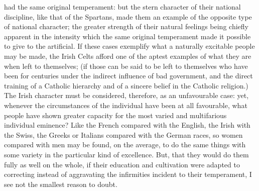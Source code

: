 \documentclass[12pt]{report}
\begin{document}
had the same original temperament: but the stern character of their national discipline, like that of the Spartans, made them an example of the opposite type of national character; the greater strength of their natural feelings being chiefly apparent in the intensity which the same original temperament made it possible to give to the artificial. If these cases exemplify what a naturally excitable people may be made, the Irish Celts afford one of the aptest examples of what they are when left to themselves; (if those can be said to be left to themselves who have been for centuries under the indirect influence of bad government, and the direct training of a Catholic hierarchy and of a sincere belief in the Catholic religion.) The Irish character must be considered, therefore, as an unfavourable case: yet, whenever the circumstances of the individual have been at all favourable, what people have shown greater capacity for the most varied and multifarious individual eminence? Like the French compared with the English, the Irish with the Swiss, the Greeks or Italians compared with the German races, so women compared with men may be found, on the average, to do the same things with some variety in the particular kind of excellence. But, that they would do them fully as well on the whole, if their education and cultivation were adapted to correcting instead of aggravating the infirmities incident to their temperament, I see not the smallest reason to doubt.
\end{document}
